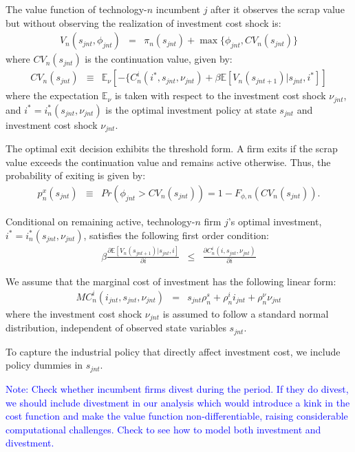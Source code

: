 \documentclass[12pt]{article}
\begin{document}
The value function of technology-$n$ incumbent $j$ after it observes the scrap value but without observing the realization of investment cost shock is:
\begin{eqnarray}
V_n(s_{jnt},\phi_{jnt})&=&\pi_n(s_{jnt})+\max\{\phi_{jnt},CV_n(s_{jnt})\}  \label{eq:incumbent_value_fn} 
\end{eqnarray}
where $CV_n(s_{jnt})$ is the continuation value, given by:
\begin{eqnarray}
CV_n(s_{jnt}) & \equiv & \mathbb{E}_{\nu}[-\{C_n^i(i^*,s_{jnt},\nu_{jnt})+\beta \mathbb{E}[V_n(s_{jnt+1})|s_{jnt},i^*]] \label{eq:incumbent_EV_fn}
\end{eqnarray}
where the expectation $\mathbb{E}_{\nu}$ is taken with respect to the investment cost shock $\nu_{jnt}$, and $i^* = i^*_n(s_{jnt},\nu_{jnt})$ is the optimal investment policy at state $s_{jnt}$ and investment cost shock $\nu_{jnt}$.
        
The optimal exit decision exhibits the threshold form. A firm exits if the scrap value exceeds the continuation value and remains active otherwise. Thus, the probability of exiting is given by:
\begin{eqnarray}
    p_n^x(s_{jnt}) & \equiv & Pr(\phi_{jnt} > CV_n(s_{jnt})) = 1-F_{\phi,n}(CV_n(s_{jnt})). \label{eq:exit_policy_fn}
\end{eqnarray}

Conditional on remaining active, technology-$n$ firm $j$'s optimal investment, $i^*=i_n^*(s_{jnt},\nu_{jnt})$, satisfies the following first order condition:
\begin{eqnarray}
    \beta\frac{\partial \mathbb{E}[V_n(s_{jnt+1})|s_{jnt},i]}{\partial i} &\leq & \frac{\partial C_n^i(i,s_{jnt},\nu_{jnt})}{\partial i} \label{eq:investment_policy_fn}
\end{eqnarray}

We assume that the marginal cost of investment has the following linear form:
\begin{eqnarray}
   MC_n^i(i_{jnt}, s_{jnt}, \nu_{jnt}) & = & s_{jnt} \rho^s_{n} + \rho^i_{n} i_{jnt} + \rho^{\nu}_{n} \nu_{jnt} \label{eq:investment_cost}
\end{eqnarray} 
where the investment cost shock $\nu_{jnt}$ is assumed to follow a standard normal distribution, independent of observed state variables $s_{jnt}$.

To capture the industrial policy that directly affect investment cost, we include policy dummies in $s_{jnt}$.


\textcolor{blue}{Note: Check whether incumbent firms divest during the period. If they do divest, we should include divestment in our analysis which would introduce a kink in the cost function and make the value function non-differentiable, raising considerable computational challenges. Check \citet{ryan2012costs} to see how to model both investment and divestment. }
\end{document}
